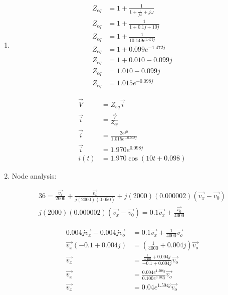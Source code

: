 \documentclass[11pt]{article}
\begin{document}
\begin{enumerate}[\alph*)]

\item

\begin{align*}
Z _{eq} &= 1 + \frac{1}{1 + \frac{1}{j \omega} + j \omega} \\
Z _{eq} &= 1 + \frac{1}{1 + 0.1j + 10j} \\
Z _{eq} &= 1 + \frac{1}{10.149 e ^{1.472 j}} \\
Z _{eq} &= 1 + 0.099 e ^{-1.472 j} \\
Z _{eq} &= 1 + 0.010 - 0.099j \\
Z _{eq} &= 1.010 - 0.099j \\
Z _{eq} &= 1.015 e ^{-0.098 j}
\end{align*}

\begin{align*}
\vec{V} &= Z_{eq} \vec{i} \\
\vec{i} &= \frac{\vec{V}}{Z _{eq}} \\
\vec{i} &= \frac{2 e ^{j 0}}{1.015 e ^{-0.098 j}} \\
\vec{i} &= 1.970 e ^{0.098 j} \\
i (t) &= \boxed{1.970 \cos (10t + 0.098)}
\end{align*}

\item

Node analysis:

\begin{align*}
36 = \frac{\vec{v_x}}{2000} + \frac{\vec{v_x}}{j (2000)(0.050)} + j (2000) (0.000002) (\vec{v_x} - \vec{v_0}) \\
j (2000) (0.000002) (\vec{v_x} - \vec{v_0}) = 0.1 \vec{v_x} + \frac{\vec{v_0}}{4000}
\end{align*}

\begin{align*}
0.004 j \vec{v_x} - 0.004 j \vec{v_o} &= 0.1 \vec{v_x} + \frac{1}{4000} \vec{v_o} \\
\vec{v_x} (-0.1 + 0.004j) &= (\frac{1}{4000} + 0.004j) \vec{v_o} \\
\vec{v_x} &= \frac{\frac{1}{4000} + 0.004j}{-0.1 + 0.004j} \vec{v_o} \\
\vec{v_x} &= \frac{0.004 e ^{1.508 j}}{0.100 e ^{3.102 j}} \vec{v_o} \\
\vec{v_x} &= 0.04 e ^{1.594 j} \vec{v_o}
\end{align*}


\end{enumerate}
\end{document}

